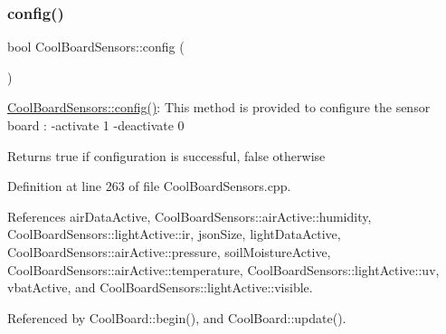 \subsubsection{\texorpdfstring{config()}{config()}}
{\footnotesize\ttfamily bool Cool\+Board\+Sensors\+::config (\begin{DoxyParamCaption}{ }\end{DoxyParamCaption})}

\hyperlink{classCoolBoardSensors_a9a218895c5423375c33c08f2c56fb23a}{Cool\+Board\+Sensors\+::config()}\+: This method is provided to configure the sensor board \+: -\/activate 1 -\/deactivate 0

\begin{DoxyReturn}{Returns}
true if configuration is successful, false otherwise 
\end{DoxyReturn}


Definition at line 263 of file Cool\+Board\+Sensors.\+cpp.



References air\+Data\+Active, Cool\+Board\+Sensors\+::air\+Active\+::humidity, Cool\+Board\+Sensors\+::light\+Active\+::ir, json\+Size, light\+Data\+Active, Cool\+Board\+Sensors\+::air\+Active\+::pressure, soil\+Moisture\+Active, Cool\+Board\+Sensors\+::air\+Active\+::temperature, Cool\+Board\+Sensors\+::light\+Active\+::uv, vbat\+Active, and Cool\+Board\+Sensors\+::light\+Active\+::visible.



Referenced by Cool\+Board\+::begin(), and Cool\+Board\+::update().


